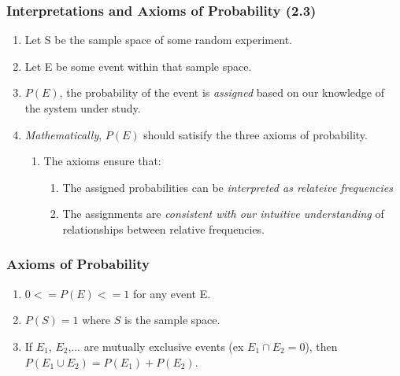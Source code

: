 \documentclass[../IND E 315.tex]{subfiles}
\begin{document}
\subsubsection*{Interpretations and Axioms of Probability (2.3)}
\begin{enumerate}
    \item Let S be the sample space of some random experiment.
    \item Let E be some event within that sample space.
    \item $P(E)$, the probability of the event is \emph{assigned} based on our knowledge of the system under study.
    \item \emph{Mathematically}, $P(E)$ should satisify the three axioms of probability.
        \begin{enumerate}
            \item The axioms ensure that:
                \begin{enumerate}
                    \item The assigned probabilities can be \emph{interpreted as relateive frequencies}
                    \item The assignments are \emph{consistent with our intuitive understanding} of relationships between relative frequencies.
                \end{enumerate}
        \end{enumerate}
\end{enumerate}

\subsubsection*{Axioms of Probability}
\begin{enumerate}
    \item $0 <= P(E) <= 1$ for any event E.
    \item $P(S) = 1$ where $S$ is the sample space.
    \item If $E_1$, $E_2$,... are mutually exclusive events (ex $E_1 \cap E_2 = 0$), then $P(E_1 \cup E_2) = P(E_1) + P(E_2)$.
\end{enumerate}
\end{document}
